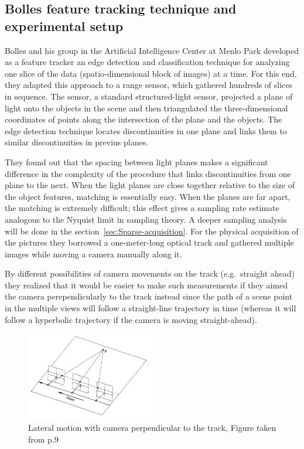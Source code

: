 \subsection{Bolles feature tracking technique and experimental setup}

Bolles and his group in the Artificial Intelligence Center at Menlo Park developed as a feature tracker an edge detection and classification technique for analyzing one slice of the data (spatio-dimensional block of images) at a time. For this end, they adapted this approach to a range sensor, which gathered hundreds of slices in sequence. The sensor, a standard structured-light sensor, projected a plane of light onto the objects in the scene and then triangulated the three-dimensional coordinates of points along the intersection of the plane and the objects. The edge detection technique locates discontinuities in one plane and links them to similar discontinuities in previus planes. 

\bigskip

They found out that the spacing between light planes makes a significant difference in the complexity of the procedure that links discontinuities from one plane to the next. When the light planes are close together relative to the size of the object features, matching is essentially easy. When the planes are far apart, the matching is extremely difficult; this effect gives a sampling rate estimate analogous to the Nyquist limit in sampling theory. A deeper sampling analysis will be done in the section~\ref{sec:Sparse-acquisition}. For the physical acquisition of the pictures they borrowed a one-meter-long optical track and gathered multiple images while moving a camera manually along it. 

\bigskip

By different possibilities of camera movements on the track (e.g.\ straight ahead) they realized that it would be easier to make such measurements if they aimed the camera perependicularly to the track instead since the path of a scene point in the multiple views will follow a straight-line trajectory in time (whereas it will follow a hyperbolic trajectory if the camera is moving straight-ahead). 

\begin{figure}[h!]
\centering
\includegraphics[width= 0.50\textwidth]{./Diagrams/perp-move.jpg}
\caption{Lateral motion with camera perpendicular to the track, Figure taken from \cite{Bolles} p.9}
\end{figure}

